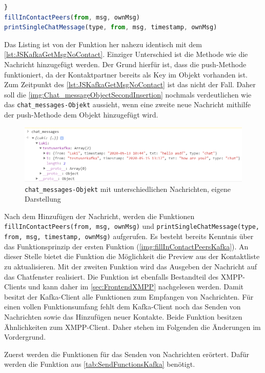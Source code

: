 \documentclass[a4paper,titlepage,halfparskip,12pt]{scrreprt}
\begin{document}
\begin{onehalfspacing}
\begin{lstlisting}[language=Javascript,caption=Weitere Verarbeitung der Nachricht,label={lst:JSKafkaNoSameMsg}]
}
fillInContactPeers(from, msg, ownMsg)
printSingleChatMessage(type, from, msg, timestamp, ownMsg)
\end{lstlisting}
Das Listing ist von der Funktion her nahezu identisch mit dem \autoref{lst:JSKafkaGetMsgNoContact}. Einziger Unterschied ist die Methode wie die Nachricht hinzugefügt werden. Der Grund hierfür ist, dass die push-Methode funktioniert, da der Kontaktpartner bereits als Key im Objekt vorhanden ist. Zum Zeitpunkt des \autoref{lst:JSKafkaGetMsgNoContact} ist das nicht der Fall. Daher soll die \autoref{img:Chat_messageObjectSecondInsertion} nochmals verdeutlichen wie das \texttt{chat\_messages-Objekt} aussieht, wenn eine zweite neue Nachricht mithilfe der push-Methode dem Objekt hinzugefügt wird.
\begin{figure}[h]
	\centering
	\includegraphics[scale=1.0]{images/Chat_messageObjectSecondInsertion}
	\caption{\texttt{chat\_messages-Objekt} mit unterschiedlichen Nachrichten, eigene Darstellung}
	\label{img:Chat_messageObjectSecondInsertion}
\end{figure}
Nach dem Hinzufügen der Nachricht, werden die Funktionen \texttt{fillInContactPeers(from, msg, ownMsg)} und \texttt{printSingleChatMessage(type, from, msg, timestamp, ownMsg)} aufgerufen. Es besteht bereits Kenntnis über das Funktionsprinzip der ersten Funktion (\autoref{img:fillInContactPeersKafka}). An dieser Stelle bietet die Funktion die Möglichkeit die Preview aus der Kontaktliste zu aktualisieren. Mit der zweiten Funktion wird das Ausgeben der Nachricht auf das Chatfenster realisiert. Die Funktion ist ebenfalls Bestandteil des XMPP-Clients und kann daher im \autoref{sec:FrontendXMPP} nachgelesen werden. Damit besitzt der Kafka-Client alle Funktionen zum Empfangen von Nachrichten. Für einen vollen Funktionsumfang fehlt dem Kafka-Client noch das Senden von Nachrichten sowie das Hinzufügen neuer Kontakte. Beide Funktion besitzen Ähnlichkeiten zum XMPP-Client. Daher stehen im Folgenden die Änderungen im Vordergrund.

\pagebreak

Zuerst werden die Funktionen für das Senden von Nachrichten erörtert. Dafür werden die Funktion aus \autoref{tab:SendFunctionsKafka} benötigt.


\end{onehalfspacing}
\end{document}
